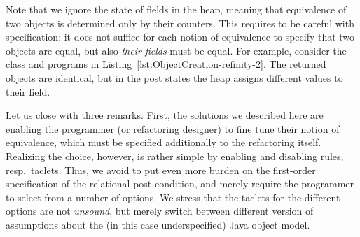 Note that we ignore the state of fields in the heap, meaning that equivalence of two objects is determined only by their counters. 
This requires to be careful with specification: it does not suffice for each notion of equivalence to specify that two objects are equal, but also \emph{their fields} must be equal.
For example, consider the class and programs in Listing~\ref{lst:ObjectCreation-refinity-2}.
The returned objects are identical, but in the post states the heap assigns different values to their field.



Let us close with three remarks. First, the solutions we described here are enabling the programmer (or refactoring designer) to fine tune their notion of equivalence, which must be specified additionally to the refactoring itself.
Realizing the choice, however, is rather simple by enabling and disabling rules, resp.\ taclets. 
Thus, we avoid to put even more burden on the first-order specification of the relational post-condition, and merely require the programmer to select from a number of options.
We stress that the taclets for the different options are not \emph{unsound}, but merely switch between different version of assumptions about the (in this case underspecified) Java object model. 

